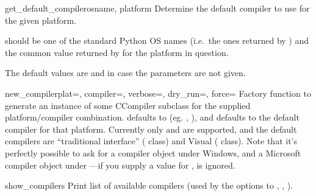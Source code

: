 \documentclass{manual}
\begin{document}
\begin{funcdesc}{get_default_compiler}{osname, platform}
Determine the default compiler to use for the given platform.
    
 should be one of the standard Python OS names (i.e.\ the
ones returned by ) and  the common value
returned by  for the platform in question.
    
The default values are  and  in case the
parameters are not given.
\end{funcdesc}

\begin{funcdesc}{new_compiler}{plat=, compiler=, verbose=, dry_run=, force=}
Factory function to generate an instance of some CCompiler subclass
for the supplied platform/compiler combination.  defaults
to  (eg. , ), and  
defaults to the default compiler for that platform. Currently only
 and  are supported, and the default
compilers are ``traditional \UNIX{} interface'' (
class) and Visual \Cpp ( class).  Note that it's
perfectly possible to ask for a \UNIX{} compiler object under Windows,
and a Microsoft compiler object under \UNIX---if you supply a value
for ,  is ignored.
\end{funcdesc}

\begin{funcdesc}{show_compilers}{}
Print list of available compilers (used by the
 options to ,
, ).
\end{funcdesc}
\end{document}
